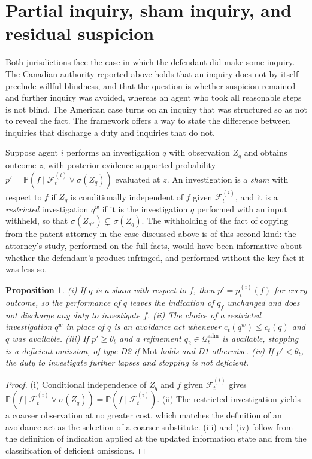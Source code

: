 \documentclass[11pt]{article}
\newcommand{\F}{\mathcal F}
\newcommand{\Q}{\mathcal Q}
\newcommand{\PP}{\mathbb P}
\newcommand{\adm}{\mathrm{adm}}
\theoremstyle{plain}
\newtheorem{proposition}{Proposition}
\theoremstyle{definition}
\begin{document}
\section{Partial inquiry, sham inquiry, and residual suspicion}

Both jurisdictions face the case in which the defendant did make some inquiry. The Canadian authority reported above holds that an inquiry does not by itself preclude willful blindness, and that the question is whether suspicion remained and further inquiry was avoided, whereas an agent who took all reasonable steps is not blind. The American case turns on an inquiry that was structured so as not to reveal the fact. The framework offers a way to state the difference between inquiries that discharge a duty and inquiries that do not.

Suppose agent $i$ performs an investigation $q$ with observation $Z_q$ and obtains outcome $z$, with posterior evidence-supported probability $p'=\PP(f\mid\F^{(i)}_t\vee\sigma(Z_q))$ evaluated at $z$. An investigation is a \emph{sham} with respect to $f$ if $Z_q$ is conditionally independent of $f$ given $\F^{(i)}_t$, and it is a \emph{restricted} investigation $q^{w}$ if it is the investigation $q$ performed with an input withheld, so that $\sigma(Z_{q^{w}})\subsetneq\sigma(Z_q)$. The withholding of the fact of copying from the patent attorney in the case discussed above is of this second kind: the attorney's study, performed on the full facts, would have been informative about whether the defendant's product infringed, and performed without the key fact it was less so.

\begin{proposition}\label{prop:inquiry}
(i) If $q$ is a sham with respect to $f$, then $p'=p^{(i)}_t(f)$ for every outcome, so the performance of $q$ leaves the indication of $q_f$ unchanged and does not discharge any duty to investigate $f$. (ii) The choice of a restricted investigation $q^{w}$ in place of $q$ is an avoidance act whenever $c_t(q^{w})\le c_t(q)$ and $q$ was available. (iii) If $p'\ge\theta_t$ and a refinement $q_2\in\Q_t^{\adm}$ is available, stopping is a deficient omission, of type D2 if $\mathrm{Mot}$ holds and D1 otherwise. (iv) If $p'<\theta_t$, the duty to investigate further lapses and stopping is not deficient.
\end{proposition}

\begin{proof}
(i) Conditional independence of $Z_q$ and $f$ given $\F^{(i)}_t$ gives $\PP(f\mid\F^{(i)}_t\vee\sigma(Z_q))=\PP(f\mid\F^{(i)}_t)$. (ii) The restricted investigation yields a coarser observation at no greater cost, which matches the definition of an avoidance act as the selection of a coarser substitute. (iii) and (iv) follow from the definition of indication applied at the updated information state and from the classification of deficient omissions.
\end{proof}
\end{document}
